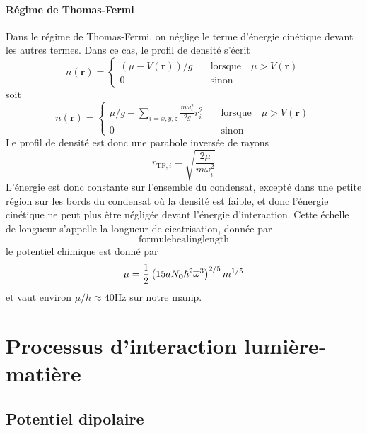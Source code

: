 \paragraph*{Régime de Thomas-Fermi}
Dans le régime de Thomas-Fermi, on néglige le terme d'énergie cinétique devant les autres termes. 
Dans ce cas, le profil de densité s'écrit
\begin{equation}
n(\mathbf{r})=\left\{
					\begin{array}{ll}
						(\mu-V(\mathbf{r}))/g &\quad \text{lorsque} \quad \mu>V(\mathbf{r})\\
						0 &\quad \text{sinon}
					\end{array} 
				\right.
\end{equation}
soit
\begin{equation}
n(\mathbf{r})=\left\{
					\begin{array}{ll}
						\mu/g-\sum_{i=x,y,z}\frac{m\omega_i^2}{2g}r_i^2 &\quad \text{lorsque} \quad \mu>V(\mathbf{r})\\
						0 &\quad \text{sinon}
					\end{array} 
				\right.
\end{equation}
Le profil de densité est donc une parabole inversée de rayons
\begin{equation}
r_{\mathrm{TF},i}=\sqrt{\frac{2\mu}{m\omega_i^2}}
\end{equation}
L'énergie est donc constante sur l'ensemble du condensat, excepté dans une petite région sur les bords du condensat où la densité est faible, et donc l'énergie cinétique ne peut plus être négligée devant l'énergie d'interaction. Cette échelle de longueur s'appelle la longueur de cicatrisation, donnée par 
\begin{equation}
\mathrm{formulehealinglength}
\end{equation}
le potentiel chimique est donné par 
\begin{equation}
\mu=\frac{1}{2} \left( 15a N_{\mathbf{0}} \hslash^2 \overline{\omega}^3 \right) ^{2/5} m^{1/5}
\end{equation}
et vaut environ $\mu/h\approx40$Hz sur notre manip.

\section{Processus d'interaction lumière-matière} 
\subsection{Potentiel dipolaire}
